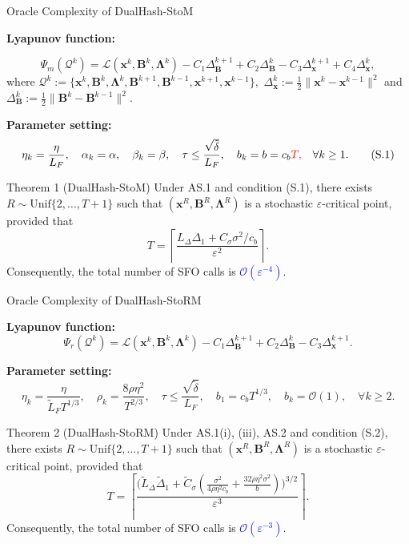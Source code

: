 \documentclass[mathserif,compress,override,9pt]{beamer}
\numberwithin{equation}{section}
\newcommand{\nii}{\noindent}
\newcommand{\bx}{\bm{x}}
\newcommand{\bB}{\bm{B}}
\newcommand{\bLmbd}{\bm{\Lambda}}
\newcommand{\calL}{\mathcal{L}}
\newcommand{\calO}{\mathcal{O}}
\newcommand{\calQ}{\mathcal{Q}}
\newcommand{\blue}[1]{\textcolor{blue}{#1}}
\newcommand{\red}[1]{\textcolor{red}{#1}}
\theoremstyle{remark}
\begin{document}
\begin{frame}{Oracle Complexity of DualHash-StoM}
\vspace{0.1cm}
\small

\nii\textbf{Lyapunov function:}

\[
\Psi_m(\calQ^k)=\calL(\bx^k,\bB^k,\bLmbd^k)-C_1\Delta_{\bB}^{k+1}+C_2\Delta_{\bB}^k-C_3\Delta_{\bx}^{k+1}+C_4\Delta_{\bx}^k,
\]
where $\calQ^k:=\bigl\{\bx^k,\bB^k,\bLmbd^k,\bB^{k+1},\bB^{k-1},\bx^{k+1},\bx^{k-1}\bigr\},$ $\Delta_{\bx}^{k}:=\tfrac{1}{2}\|\bx^{k}-\bx^{k-1}\|^2$
and $\Delta_{\bB}^{k}:=\tfrac{1}{2}\|\bB^{k}-\bB^{k-1}\|^2$.

 \bigskip

\nii\textbf{Parameter setting:}
\begin{equation}
  \eta_k=\frac{\eta}{L_F},\quad \alpha_k=\alpha,\quad \beta_k=\beta,\quad \tau\le\frac{\sqrt{\tilde\delta}}{L_F},\quad b_k=b=c_b \red{T,} \quad \forall k \geq 1. \tag{S.1}
\end{equation}
\vspace{0.2cm}
\begin{block}{Theorem 1 (DualHash-StoM)}
Under AS.1 and condition (S.1), there exists $R\sim\mathrm{Unif}\{2,\dots,T+1\}$ such that $(\bx^R,\bB^R,\bLmbd^R)$ is a stochastic $\varepsilon$-critical point, provided that
\[
T=\left\lceil\frac{L_\Delta\Delta_1+C_\sigma\sigma^2/c_b}{\varepsilon^2}\right\rceil.
\] Consequently, the total number of SFO calls is \blue{$\calO(\varepsilon^{-4})$}.
\end{block}
\end{frame}


\begin{frame}{Oracle Complexity of DualHash-StoRM}
\vspace{0.1cm}
\small

\nii\textbf{Lyapunov function:}
\[
\Psi_r(\calQ^k)=\calL(\bx^k,\bB^k,\bLmbd^k)-C_1\Delta_{\bB}^{k+1}+C_2\Delta_{\bB}^k-C_3\Delta_{\bx}^{k+1}.
\]

\nii\textbf{Parameter setting:}
\begin{equation}
  \eta_k=\frac{\eta}{\tilde L_F T^{1/3}},\quad \rho_k=\frac{8\rho\eta^2}{T^{2/3}},\quad \tau\le\frac{\sqrt{\tilde\delta}}{L_F},\quad b_1=c_b T^{1/3}, \quad b_k = \calO(1), \quad \forall k \geq 2.  \tag{S.2}
\end{equation}

\vspace{0.2cm}
\begin{block}{Theorem 2 (DualHash-StoRM)}
Under AS.1(i), (iii), AS.2 and condition (S.2), there exists $R\sim\mathrm{Unif}\{2,\dots,T+1\}$ such that $(\bx^R,\bB^R,\bLmbd^R)$ is a stochastic $\varepsilon$-critical point, provided that
\[
T=\left\lceil\frac{\bigl(\tilde L_\Delta\tilde\Delta_1+\tilde C_\sigma(\frac{\sigma^2}{4\rho\eta^2 c_b}+\frac{32\rho\eta^2\sigma^2}{b})\bigr)^{3/2}}{\varepsilon^3}\right\rceil.
\] Consequently, the total number of SFO calls is \blue{$\calO(\varepsilon^{-3})$}.
\end{block}
\end{frame}
\end{document}
